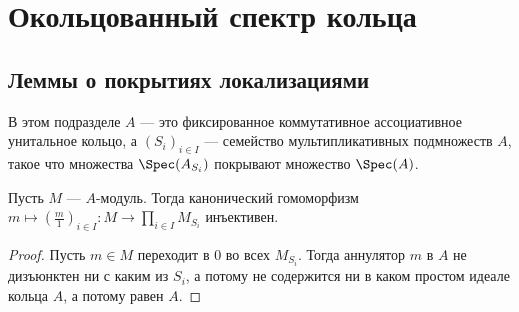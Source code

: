\documentclass[
	extrafontsizes,
	11pt,
	hyphens,
]{memoir}
\begin{document}
\section{Окольцованный спектр кольца}

\subsection{Леммы о покрытиях локализациями}

\begin{convention}
В этом подразделе \(A\) --- это фиксированное коммутативное ассоциативное унитальное кольцо, а \((S_i)_{i \in I}\) --- семейство мультипликативных подмножеств \(A\), такое что множества \(\Spec(A_{S_i})\) покрывают множество \(\Spec(A)\).
\end{convention}


\begin{lemma} \label{lem:LocCoverInj}
Пусть \(M\) --- \(A\)-мо\-дуль.
Тогда канонический гомоморфизм
\(m \mapsto (\frac{m}{1})_{i \in I} : M \to \prod_{i \in I} M_{S_i}\)
инъективен.
\end{lemma}

\begin{proof}
Пусть \(m \in M\) переходит в \(0\) во всех \(M_{S_i}\). Тогда аннулятор \(m\) в \(A\) не дизъюнктен ни с каким из \(S_i\), а потому не содержится ни в каком простом идеале кольца \(A\), а потому равен \(A\). 
\end{proof}

\end{document}
